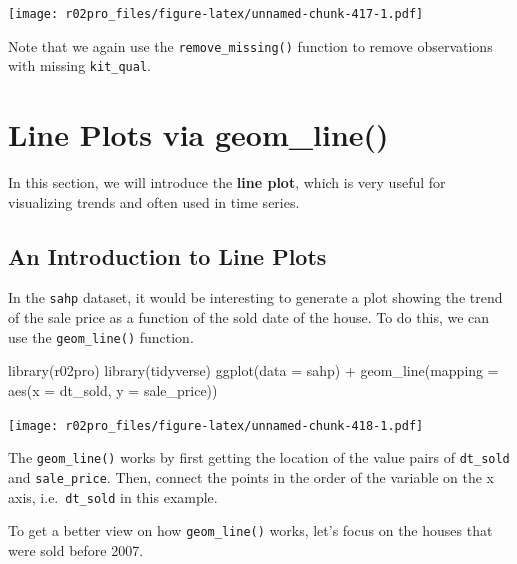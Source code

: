 \documentclass[
]{book}
\newenvironment{Shaded}{\begin{snugshade}}{\end{snugshade}}
\newcommand{\AttributeTok}[1]{\textcolor[rgb]{0.77,0.63,0.00}{#1}}
\newcommand{\CommentTok}[1]{\textcolor[rgb]{0.56,0.35,0.01}{\textit{#1}}}
\newcommand{\DecValTok}[1]{\textcolor[rgb]{0.00,0.00,0.81}{#1}}
\newcommand{\FunctionTok}[1]{\textcolor[rgb]{0.00,0.00,0.00}{#1}}
\newcommand{\NormalTok}[1]{#1}
\newcommand{\OtherTok}[1]{\textcolor[rgb]{0.56,0.35,0.01}{#1}}
\newcommand{\SpecialCharTok}[1]{\textcolor[rgb]{0.00,0.00,0.00}{#1}}
\newcommand{\StringTok}[1]{\textcolor[rgb]{0.31,0.60,0.02}{#1}}
\begin{document}
\texttt{[image: r02pro\_files/figure-latex/unnamed-chunk-417-1.pdf]}

Note that we again use the \texttt{remove\_missing()} function to remove observations with missing \texttt{kit\_qual}.

\hypertarget{line-plot}{%
\section{Line Plots via geom\_line()}\label{line-plot}}

In this section, we will introduce the \textbf{line plot}, which is very useful for visualizing trends and often used in time series.

\hypertarget{an-introduction-to-line-plots}{%
\subsection{An Introduction to Line Plots}\label{an-introduction-to-line-plots}}

In the \texttt{sahp} dataset, it would be interesting to generate a plot showing the trend of the sale price as a function of the sold date of the house. To do this, we can use the \texttt{geom\_line()} function.

\begin{Shaded}
\begin{Highlighting}[]
\FunctionTok{library}\NormalTok{(r02pro)}
\FunctionTok{library}\NormalTok{(tidyverse)}
\FunctionTok{ggplot}\NormalTok{(}\AttributeTok{data =}\NormalTok{ sahp) }\SpecialCharTok{+} \FunctionTok{geom\_line}\NormalTok{(}\AttributeTok{mapping =} \FunctionTok{aes}\NormalTok{(}\AttributeTok{x =}\NormalTok{ dt\_sold, }\AttributeTok{y =}\NormalTok{ sale\_price))}
\end{Highlighting}
\end{Shaded}

\texttt{[image: r02pro\_files/figure-latex/unnamed-chunk-418-1.pdf]}

The \texttt{geom\_line()} works by first getting the location of the value pairs of \texttt{dt\_sold} and \texttt{sale\_price}. Then, connect the points in the order of the variable on the x axis, i.e.~\texttt{dt\_sold} in this example.

To get a better view on how \texttt{geom\_line()} works, let's focus on the houses that were sold before 2007.

\begin{Shaded}
\end{Shaded}
\end{document}
